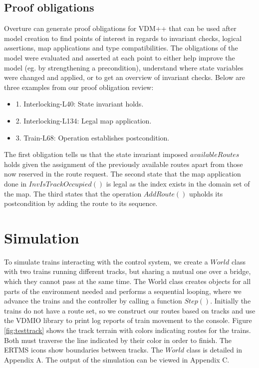 \documentclass[preprint,12pt]{elsarticle}
\begin{document}
\subsection{Proof obligations}

Overture can generate proof obligations for VDM++ that can be used after model creation to find points of interest in regards to invariant checks, logical assertions, map applications and type compatibilities. The obligations of the model were evaluated and asserted at each point to either help improve the model (eg. by strengthening a precondition), understand where state variables were changed and applied, or to get an overview of invariant checks. Below are three examples from our proof obligation review:

\begin{itemize}
	\item 1. Interlocking-L40: State invariant holds.
	\item 2. Interlocking-L134: Legal map application.
	\item 3. Train-L68: Operation establishes postcondition.
\end{itemize}

The first obligation tells us that the state invariant imposed $availableRoutes$ holds given the assignment of the previously available routes apart from those now reserved in the route request. The second state that the map application done in $InvIsTrackOccupied()$ is legal as the index exists in the domain set of the map. The third states that the operation $AddRoute()$ upholds its postcondition by adding the route to its sequence.

\section{Simulation}

To simulate trains interacting with the control system, we create a $World$ class with two trains running different tracks, but sharing a mutual one over a bridge, which they cannot pass at the same time. The World class creates objects for all parts of the environment needed and performs a sequential looping, where we advance the trains and the controller by calling a function $Step()$. Initially the trains do not have a route set, so we construct our routes based on tracks and use the VDMIO library to print log reports of train movement to the console. Figure \ref{fig:testtrack} shows the track terrain with colors indicating routes for the trains. Both must traverse the line indicated by their color in order to finish. The ERTMS icons show boundaries between tracks. The $World$ class is detailed in Appendix A. The output of the simulation can be viewed in Appendix C.
\end{document}

